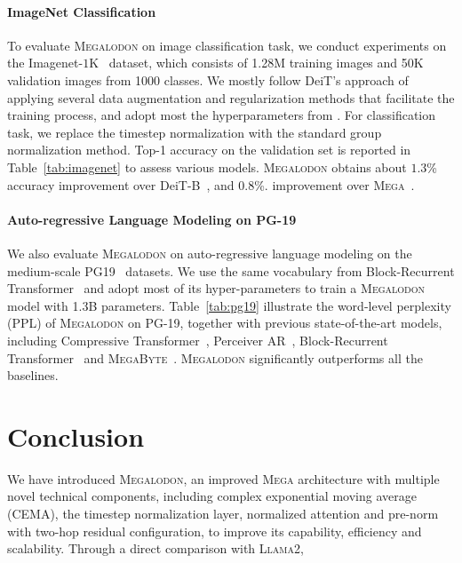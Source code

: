 \paragraph{ImageNet Classification} To evaluate \textsc{Megalodon} on image classification task, we conduct experiments on the Imagenet-$1$K~\citep{deng2009imagenet} dataset, which consists of 1.28M training images and 50K validation images from 1000 classes. We mostly follow DeiT's approach of applying several data augmentation and regularization methods that facilitate the training process, and adopt most the hyperparameters from \citet{ma2023mega}.
For classification task, we replace the timestep normalization with the standard group normalization method. Top-1 accuracy on the validation set is reported in Table~\ref{tab:imagenet} to assess various models.
\textsc{Megalodon} obtains about $1.3$\% accuracy improvement over DeiT-B~\citep{touvron2021training}, and $0.8$\%. improvement over \textsc{Mega}~\citep{ma2023mega}.

\paragraph{Auto-regressive Language Modeling on PG-19} We also evaluate \textsc{Megalodon} on auto-regressive language modeling on the medium-scale PG19~\citep{raecompressive2019} datasets. We use the same vocabulary from Block-Recurrent Transformer~\citep{hutchins2022block} and adopt most of its hyper-parameters to train a \textsc{Megalodon} model with 1.3B parameters.
Table~\ref{tab:pg19} illustrate the word-level perplexity (PPL) of \textsc{Megalodon} on PG-19, together with previous state-of-the-art models, including Compressive Transformer~\citep{rae2020compressive}, Perceiver AR~\citep{hawthorne2022general}, Block-Recurrent Transformer~\citep{hutchins2022block} and \textsc{MegaByte}~\citep{yu2024megabyte}. 
\textsc{Megalodon} significantly outperforms all the baselines.

\section{Conclusion}

We have introduced \textsc{Megalodon}, an improved \textsc{Mega} architecture with multiple novel technical components, including complex exponential moving average (CEMA), the timestep normalization layer, normalized attention and pre-norm with two-hop residual configuration, to improve its capability, efficiency and scalability. Through a direct comparison with \textsc{Llama}2, 

